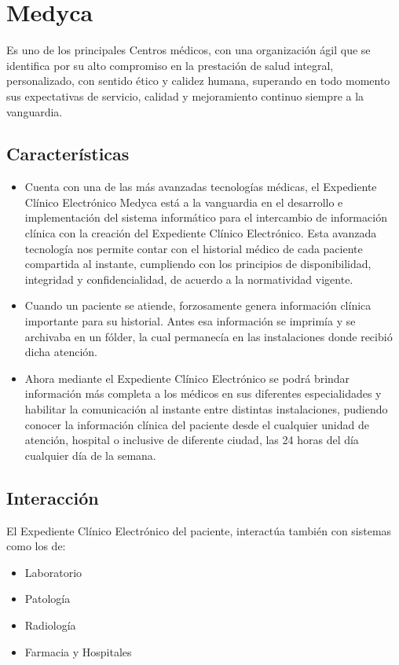 \section{Medyca}
Es uno de los principales Centros médicos, con una organización ágil que se identifica por su alto compromiso en la prestación de salud integral, personalizado, con sentido ético y calidez humana, superando en todo momento sus expectativas de servicio, calidad y mejoramiento continuo siempre a la vanguardia. \cite{mediesel}

\subsection{Características}
\begin{itemize}
  \item Cuenta con una de las más avanzadas tecnologías médicas, el Expediente Clínico Electrónico Medyca está a la vanguardia en el desarrollo e implementación del sistema informático para el intercambio de información clínica con la creación del Expediente Clínico Electrónico. Esta avanzada tecnología nos permite contar con el historial médico de cada paciente compartida al instante, cumpliendo con los principios de disponibilidad, integridad y confidencialidad, de acuerdo a la normatividad vigente. \cite{mediesel}

\item Cuando un paciente se atiende, forzosamente genera información clínica importante para su historial. Antes esa información se imprimía y se archivaba en un fólder, la cual permanecía en las instalaciones donde recibió dicha atención.\cite{mediesel}

\item Ahora mediante el Expediente Clínico Electrónico se podrá brindar información más completa a los médicos en sus diferentes especialidades y habilitar la comunicación al instante entre distintas instalaciones, pudiendo conocer la información clínica del paciente desde el cualquier unidad de atención, hospital o inclusive de diferente ciudad, las 24 horas del día cualquier día de la semana. \cite{mediesel}
\end{itemize}

\subsection{Interacción}
El Expediente Clínico Electrónico del paciente, interactúa también con sistemas como los de:
\begin{itemize}
  \item Laboratorio
  \item Patología
  \item Radiología
  \item Farmacia y Hospitales
\end{itemize}

